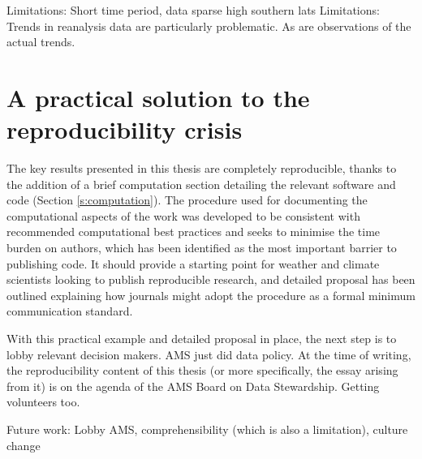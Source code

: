 Limitations: Short time period, data sparse high southern lats
Limitations: Trends in reanalysis data are particularly problematic. As are observations of the actual trends.


\section{A practical solution to the reproducibility crisis}

The key results presented in this thesis are completely reproducible, thanks to the addition of a brief computation section detailing the relevant software and code (Section \ref{s:computation}). The procedure used for documenting the computational aspects of the work was developed to be consistent with recommended computational best practices and seeks to minimise the time burden on authors, which has been identified as the most important barrier to publishing code. It should provide a starting point for weather and climate scientists looking to publish reproducible research, and detailed proposal has been outlined explaining how journals might adopt the procedure as a formal minimum communication standard.

With this practical example and detailed proposal in place, the next step is to lobby relevant decision makers. AMS just did data policy. At the time of writing, the reproducibility content of this thesis (or more specifically, the essay arising from it) is on the agenda of the AMS Board on Data Stewardship. Getting volunteers too.

Future work: Lobby AMS, comprehensibility (which is also a limitation), culture change



